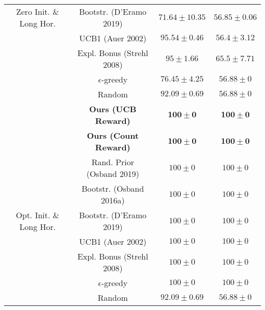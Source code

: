 \documentclass{article}
\begin{document}
\begin{table}[h]
\begin{tabular}{ c | c | c c }
 Zero Init. \& Long Hor. & Bootstr. (D'Eramo 2019) & $71.64 \pm 10.35$ & $56.85 \pm 0.06$ \\
 & UCB1 (Auer 2002) & $95.54 \pm 0.46$ & $56.4 \pm 3.12$ \\
 & Expl. Bonus (Strehl 2008) & $95 \pm 1.66$ & $65.5 \pm 7.71$ \\
 & $\epsilon$-greedy & $76.45 \pm 4.25$ & $56.88 \pm 0$ \\
 & Random & $92.09 \pm 0.69$ & $56.88 \pm 0$ \\
 \hline
 & \textbf{Ours (UCB Reward)} & $\mathbf{100 \pm 0}$ & $\mathbf{100 \pm 0}$ \\
 & \textbf{Ours (Count Reward)} & $\mathbf{100 \pm 0}$ & $\mathbf{100 \pm 0}$ \\
 & Rand. Prior (Osband 2019) & $100 \pm 0$ & $100 \pm 0$ \\
 & Bootstr. (Osband 2016a) & $100 \pm 0$ & $100 \pm 0$ \\
 Opt. Init. \& Long Hor. & Bootstr. (D'Eramo 2019) & $100 \pm 0$ & $100 \pm 0$ \\
 & UCB1 (Auer 2002) & $100 \pm 0$ & $100 \pm 0$ \\
 & Expl. Bonus (Strehl 2008) & $100 \pm 0$ & $100 \pm 0$ \\
 & $\epsilon$-greedy & $100 \pm 0$ & $100 \pm 0$ \\
 & Random & $92.09 \pm 0.69$ & $56.88 \pm 0$ \\
\end{tabular}
\end{table}
\end{document}
